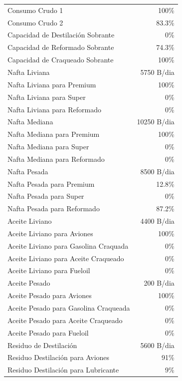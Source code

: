 \documentclass[a4paper,10pt]{article}
\begin{document}
\begin{center}
 \begin{tabular}{ l  r }
	\hline
	Consumo Crudo 1 			&	 100\% 	\\
	Consumo Crudo 2 			& 	83.3\%	\\ \hline
	Capacidad de Destilaci\'on Sobrante	&	   0\%	\\
	Capacidad de Reformado Sobrante	&	74.3\%	\\
	Capacidad de Craqueado Sobrante	&	 100\%	\\ \hline
	Nafta Liviana				& 	 5750 B/dia \\
	Nafta Liviana para Premium		& 	 100\%	\\
	Nafta Liviana para Super		& 	   0\%	\\
	Nafta Liviana para Reformado		& 	   0\%	\\ \hline
	Nafta Mediana 				& 	 10250 B/dia\\
	Nafta Mediana para Premium		& 	 100\%	\\
	Nafta Mediana para Super		& 	   0\%	\\
	Nafta Mediana para Reformado		& 	   0\%	\\ \hline
	Nafta Pesada 				&       8500 B/dia	\\
	Nafta Pesada para Premium		&       12.8\%	\\
	Nafta Pesada para Super			&  	   0\%	\\
	Nafta Pesada para Reformado		&       87.2\%	\\ \hline
	Aceite Liviano				&	4400 B/dia \\
	Aceite Liviano para Aviones		& 	  100\%	\\
	Aceite Liviano para Gasolina Craquada	& 	  0\%	\\
	Aceite Liviano para Aceite Craqueado	& 	  0\%	\\
	Aceite Liviano para Fueloil		& 	  0\%	\\ \hline
	Aceite Pesado 				&	200 B/dia	\\
	Aceite Pesado para Aviones		& 	  100\%	\\
	Aceite Pesado para Gasolina Craqueada	& 	  0\%	\\
	Aceite Pesado para Aceite Craqueado		& 	  0\%	\\
	Aceite Pesado para Fueloil		& 	  0\%	\\ \hline
	Residuo de Destilaci\'on		& 	5600 B/dia	\\ 
	Residuo Destilaci\'on para Aviones	& 	91\%	\\ 
	Residuo Destilaci\'on para Lubricante	& 	9\%	\\ 

\end{tabular}
\end{center}
\end{document}

